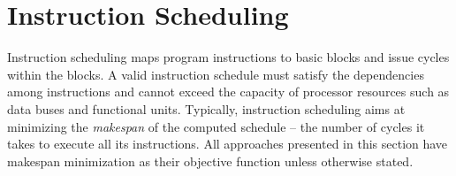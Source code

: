\documentclass[acmsmall,authorversion,nonacm]{acmart}
\begin{document}
\section{Instruction Scheduling}\label{sec:instruction-scheduling}

Instruction scheduling maps program instructions to basic blocks and
issue cycles within the blocks.
A valid instruction schedule must satisfy the dependencies among
instructions and cannot exceed the capacity of processor resources
such as data buses and functional units.
Typically, instruction scheduling aims at minimizing the
\emph{makespan} of the computed schedule -- the number of cycles it
takes to execute all its instructions.
All approaches presented in this section have makespan minimization as
their objective function unless otherwise stated.
\end{document}
